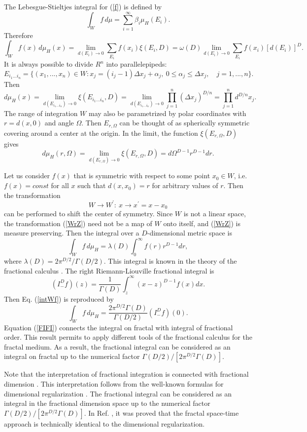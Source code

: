 \documentclass[12pt]{article}
\newcommand{\be}{\begin{equation}}
\newcommand{\ee}{\end{equation}}
\begin{document}
The Lebesgue-Stieltjes integral for (\ref{f}) 
is defined by
\be \label{LSI}
\int_W f \, d \mu =\sum^{\infty}_{i=1} \beta_i \mu_H(E_i).
\ee
Therefore
\be \label{int}
\int_W f(x) \, d \mu_H (x) =
\lim_{ d(E_i) \rightarrow 0} \sum_{E_i} f(x_i) \xi(E_i,D)
=\omega(D) \lim_{ d(E_i) \rightarrow 0} \sum_{E_i} f(x_i) [d(E_i)]^D .
\ee
It is always possible to divide $R^n$ into parallelepipeds:
\be
E_{i_1...i_n} =\{  (x_1,...,x_n) \in W: x_j =
(i_j-1) \Delta x_j +\alpha_j, \
0 \le \alpha_j \le \Delta x_j, \quad j=1,...,n \} .
\ee
Then
\be
d \mu_H (x)= \lim_{d(E_{i_1...i_n}) \rightarrow 0}
\xi(E_{i_1 ... i_n},D)
=\lim_{d(E_{i_1 ... i_n}) \rightarrow 0}
\prod^n_{j=1} (\Delta x_j)^{D/n}=\prod^n_{j=1} d^{D/n} x_j .
\ee
The range of integration $W$ may also be parametrized by 
polar coordinates with $r=d(x, 0)$ and angle $\Omega$. 
Then $E_{r,\Omega}$ can be thought of as spherically 
symmetric covering around a center at the origin. 
In the limit, the function $\xi(E_{r,\Omega},D)$ gives
\be
d\mu_H(r,\Omega)=\lim_{d(E_{r, \Omega}) \rightarrow 0}
\xi (E_{r,\Omega},D)=d\Omega^{D-1} r^{D-1} dr. 
\ee

Let us consider $f(x)$ that is symmetric with respect 
to some point $x_0 \in W$, 
i.e. $f(x) = const$ for all $x$ such that $d(x, x_0)=r$ 
for arbitrary values of $r$. Then the transformation
\be \label{WrZ}
W \rightarrow W^{\prime} : \ x \rightarrow x^{\prime}=x-x_0
\ee
can be performed to shift the center of symmetry.  
Since $W$ is not a linear space, 
the transformation (\ref{WrZ}) need not be a map of $W$ onto 
itself, and (\ref{WrZ}) is measure preserving. 
Then the  integral over a $D$-dimensional metric space is 
\be \label{intWf}
\int_W f \, d\mu_H = \lambda(D) \int^{\infty}_0 f(r) r^{D-1} dr ,
\ee
where $\lambda(D)=2 \pi^{D/2} / \Gamma(D/2)$.
This integral is known in the theory of the 
fractional calculus \cite{SKM}. 
The right Riemann-Liouville 
fractional integral is
\be \label{FID}
(I^{D}_{-} f)(z)=\frac{1}{\Gamma(D)} \int^{\infty}_z (x-z)^{D-1} f(x) dx .
\ee
Then Eq. (\ref{intWf}) is reproduced by
\be \label{FIFI}
\int_W f \, d\mu_H = \frac{2 \pi^{D/2} \Gamma(D)}{\Gamma(D/2)} (I^{D}_{-} f)(0) .
\ee
Equation (\ref{FIFI}) connects the integral on fractal 
with integral of fractional order.
This result permits to apply different tools of the fractional calculus
\cite{SKM} for the fractal medium.
As a result, the fractional integral can be considered as an
integral on fractal 
up to the numerical factor $\Gamma(D/2) /[ 2 \pi^{D/2} \Gamma(D)]$.

Note that the interpretation of fractional integration
is connected with fractional dimension \cite{nonHam}.
This interpretation follows from the well-known formulas 
for dimensional regularization \cite{Col}.
The fractional integral can be considered as an
integral in the fractional dimension space
up to the numerical factor $\Gamma(D/2) /[ 2 \pi^{D/2} \Gamma(D)]$.
In Ref. \cite{Svozil}, it was proved that the fractal space-time 
approach is technically identical to the dimensional regularization.
\end{document}
